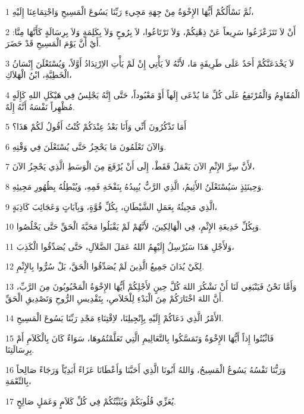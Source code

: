 \par 1 ثُمَّ نَسْأَلُكُمْ أَيُّهَا الإِخْوَةُ مِنْ جِهَةِ مَجِيءِ رَبِّنَا يَسُوعَ الْمَسِيحِ وَاجْتِمَاعِنَا إِلَيْهِ،
\par 2 أَنْ لاَ تَتَزَعْزَعُوا سَرِيعاً عَنْ ذِهْنِكُمْ، وَلاَ تَرْتَاعُوا، لاَ بِرُوحٍ وَلاَ بِكَلِمَةٍ وَلاَ بِرِسَالَةٍ كَأَنَّهَا مِنَّا: أَيْ أَنَّ يَوْمَ الْمَسِيحِ قَدْ حَضَرَ.
\par 3 لاَ يَخْدَعَنَّكُمْ أَحَدٌ عَلَى طَرِيقَةٍ مَا، لأَنَّهُ لاَ يَأْتِي إِنْ لَمْ يَأْتِ الاِرْتِدَادُ أَوَّلاً، وَيُسْتَعْلَنَ إِنْسَانُ الْخَطِيَّةِ، ابْنُ الْهَلاَكِ،
\par 4 الْمُقَاوِمُ وَالْمُرْتَفِعُ عَلَى كُلِّ مَا يُدْعَى إِلَهاً أَوْ مَعْبُوداً، حَتَّى إِنَّهُ يَجْلِسُ فِي هَيْكَلِ اللهِ كَإِلَهٍ مُظْهِراً نَفْسَهُ أَنَّهُ إِلَهٌ.
\par 5 أَمَا تَذْكُرُونَ أَنِّي وَأَنَا بَعْدُ عِنْدَكُمْ كُنْتُ أَقُولُ لَكُمْ هَذَا؟
\par 6 وَالآنَ تَعْلَمُونَ مَا يَحْجِزُ حَتَّى يُسْتَعْلَنَ فِي وَقْتِهِ.
\par 7 لأَنَّ سِرَّ الإِثْمِ الآنَ يَعْمَلُ فَقَطْ، إِلَى أَنْ يُرْفَعَ مِنَ الْوَسَطِ الَّذِي يَحْجِزُ الآنَ،
\par 8 وَحِينَئِذٍ سَيُسْتَعْلَنُ الأَثِيمُ، الَّذِي الرَّبُّ يُبِيدُهُ بِنَفْخَةِ فَمِهِ، وَيُبْطِلُهُ بِظُهُورِ مَجِيئِهِ.
\par 9 الَّذِي مَجِيئُهُ بِعَمَلِ الشَّيْطَانِ، بِكُلِّ قُوَّةٍ، وَبِآيَاتٍ وَعَجَائِبَ كَاذِبَةٍ،
\par 10 وَبِكُلِّ خَدِيعَةِ الإِثْمِ، فِي الْهَالِكِينَ، لأَنَّهُمْ لَمْ يَقْبَلُوا مَحَبَّةَ الْحَقِّ حَتَّى يَخْلُصُوا.
\par 11 وَلأَجْلِ هَذَا سَيُرْسِلُ إِلَيْهِمُ اللهُ عَمَلَ الضَّلاَلِ، حَتَّى يُصَدِّقُوا الْكَذِبَ،
\par 12 لِكَيْ يُدَانَ جَمِيعُ الَّذِينَ لَمْ يُصَدِّقُوا الْحَقَّ، بَلْ سُرُّوا بِالإِثْمِ.
\par 13 وَأَمَّا نَحْنُ فَيَنْبَغِي لَنَا أَنْ نَشْكُرَ اللهَ كُلَّ حِينٍ لأَجْلِكُمْ أَيُّهَا الإِخْوَةُ الْمَحْبُوبُونَ مِنَ الرَّبِّ، أَنَّ اللهَ اخْتَارَكُمْ مِنَ الْبَدْءِ لِلْخَلاَصِ، بِتَقْدِيسِ الرُّوحِ وَتَصْدِيقِ الْحَقِّ.
\par 14 الأَمْرُ الَّذِي دَعَاكُمْ إِلَيْهِ بِإِنْجِيلِنَا، لاِقْتِنَاءِ مَجْدِ رَبِّنَا يَسُوعَ الْمَسِيحِ.
\par 15 فَاثْبُتُوا إِذاً أَيُّهَا الإِخْوَةُ وَتَمَسَّكُوا بِالتَّعَالِيمِ الَّتِي تَعَلَّمْتُمُوهَا، سَوَاءٌ كَانَ بِالْكَلاَمِ أَمْ بِرِسَالَتِنَا.
\par 16 وَرَبُّنَا نَفْسُهُ يَسُوعُ الْمَسِيحُ، وَاللهُ أَبُونَا الَّذِي أَحَبَّنَا وَأَعْطَانَا عَزَاءً أَبَدِيّاً وَرَجَاءً صَالِحاً بِالنِّعْمَةِ،
\par 17 يُعَزِّي قُلُوبَكُمْ وَيُثَبِّتُكُمْ فِي كُلِّ كَلاَمٍ وَعَمَلٍ صَالِحٍ.

